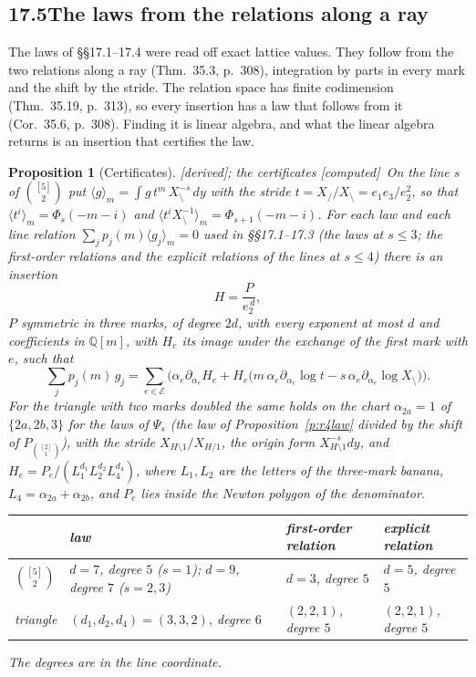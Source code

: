 \documentclass[11pt]{article}
\newcommand{\cE}{\mathcal E}
\theoremstyle{plain}
\newtheorem{proposition}{Proposition}[section]
\theoremstyle{definition}
\theoremstyle{remark}
\newcommand{\derived}{\textup{[derived]}}
\newcommand{\computed}{\textup{[computed]}}
\begin{document}
\subsection*{17.5\quad The laws from the relations along a ray}

The laws of \S\S17.1--17.4 were read off exact lattice values. They follow from the two relations along a ray (Thm.~35.3, p.~308), integration by parts in every mark and the shift by the stride. The relation space has finite codimension (Thm.~35.19, p.~313), so every insertion has a law that follows from it (Cor.~35.6, p.~308). Finding it is linear algebra, and what the linear algebra returns is an insertion that certifies the law.

\begin{proposition}[Certificates]\label{p:certs}\derived; the certificates \computed\
On the line $s$ of $\binom{[5]}2$ put $\langle g\rangle_m=\int g\,t^m\,X_{\setminus}^{-s}\,dy$ with the stride $t=X_{/}/X_{\setminus}=e_1e_3/e_2^2$, so that $\langle t^i\rangle_m=\Phi_s(-m-i)$ and $\langle t^iX_{\setminus}^{-1}\rangle_m=\Phi_{s+1}(-m-i)$. For each law and each line relation $\sum_jp_j(m)\langle g_j\rangle_m=0$ used in \S\S17.1--17.3 (the laws at $s\le3$; the first-order relations and the explicit relations of the lines at $s\le4$) there is an insertion
\[
H=\frac{P}{e_2^{\,d}},
\]
$P$ symmetric in three marks, of degree $2d$, with every exponent at most $d$ and coefficients in $\mathbb Q[m]$,
with $H_e$ its image under the exchange of the first mark with $e$, such that
\[
\sum_jp_j(m)\,g_j=\sum_{e\in\cE}\Big(\alpha_e\partial_{\alpha_e}H_e+H_e\big(m\,\alpha_e\partial_{\alpha_e}\log t-s\,\alpha_e\partial_{\alpha_e}\log X_{\setminus}\big)\Big).
\]
For the triangle with two marks doubled the same holds on the chart $\alpha_{2a}=1$ of $\{2a,2b,3\}$ for the laws of $\Psi_s$ (the law of Proposition~\ref{p:r4law} divided by the shift of $P_{\binom{[2]}1}$), with the stride $X_{H\setminus1}/X_{H/1}$, the origin form $X_{H\setminus1}^{-s}dy$, and $H_e=P_e/(L_1^{d_1}L_2^{d_2}L_4^{d_4})$, where $L_1,L_2$ are the letters of the three-mark banana, $L_4=\alpha_{2a}+\alpha_{2b}$, and $P_e$ lies inside the Newton polygon of the denominator.
\begin{center}
\small
\begin{tabular}{@{}l l l l@{}}
\toprule
& law & first-order relation & explicit relation\\ \midrule
$\binom{[5]}2$ & $d=7$, degree $5$ ($s=1$); $d=9$, degree $7$ ($s=2,3$) & $d=3$, degree $5$ & $d=5$, degree $5$\\
triangle & $(d_1,d_2,d_4)=(3,3,2)$, degree $6$ & $(2,2,1)$, degree $5$ & $(2,2,1)$, degree $5$\\
\bottomrule
\end{tabular}
\end{center}
The degrees are in the line coordinate.
\end{proposition}
\end{document}
